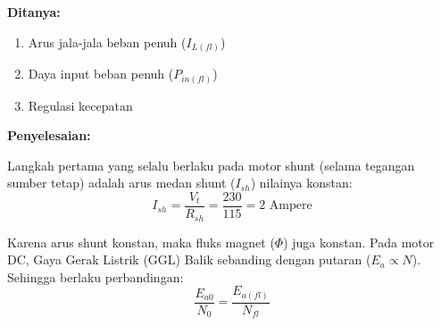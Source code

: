 \documentclass[12pt, a4paper]{article}
\begin{document}
\textbf{Ditanya:}
\begin{enumerate}[label=\alph*.]
    \item Arus jala-jala beban penuh ($I_{L(fl)}$)
    \item Daya input beban penuh ($P_{in(fl)}$)
    \item Regulasi kecepatan
\end{enumerate}

\textbf{Penyelesaian:}

Langkah pertama yang selalu berlaku pada motor shunt (selama tegangan sumber tetap) adalah arus medan shunt ($I_{sh}$) nilainya konstan:
\[
    I_{sh} = \frac{V_t}{R_{sh}} = \frac{230}{115} = 2 \text{ Ampere}
\]

Karena arus shunt konstan, maka fluks magnet ($\Phi$) juga konstan. Pada motor DC, Gaya Gerak Listrik (GGL) Balik sebanding dengan putaran ($E_a \propto N$). Sehingga berlaku perbandingan:
\[
    \frac{E_{a0}}{N_0} = \frac{E_{a(fl)}}{N_{fl}}
\]
\end{document}
